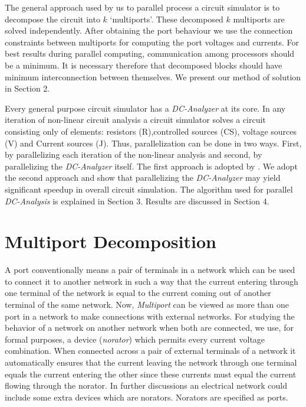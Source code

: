 \documentclass[12pt,psfig,a4]{article}
\begin{document}
The general approach used by us to parallel process a circuit simulator 
is to decompose the circuit into $k$ `multiports'. These
decomposed $k$ multiports are solved independently. 
After obtaining the port behaviour 
we use the connection constraints between multiports
for computing the port voltages and currents.
For best 
results during parallel computing, communication among processors should be a minimum. It is necessary therefore that  decomposed
blocks should have minimum interconnection between themselves.
We present our method of solution in
Section 2. 

Every general purpose circuit simulator has a {\it DC-Analyzer} at its core. In any iteration of non-linear circuit analysis a circuit simulator solves a 
circuit consisting only of elements: resistors (R),controlled sources (CS), voltage sources (V) and Current sources (J). Thus, parallelization can be done in two 
ways. First, by parallelizing each iteration of the non-linear analysis and second, by parallelizing the {\it DC-Analyzer} itself. The first 
approach is adopted by \cite{SIE}. We adopt the second approach \cite{GAK,NJB,GT} and show that parallelizing the {\it DC-Analyzer} may yield 
significant speedup in overall circuit simulation. The algorithm used for parallel {\it DC-Analysis} is explained in Section 3. 
Results are discussed in Section 4. 

\section{Multiport Decomposition}

A port conventionally means a pair of terminals in a network which can be used to connect it to another network in such a way 
that the current entering through one terminal of the network is equal to the current coming out of 
another terminal of the same network. Now, {\it Multiport} can be viewed as more than one port in a network 
to make connections with external networks. For studying the behavior of a network on another network when both are
connected, we use, for formal purposes, a device ({\it norator}) which permits every current voltage combination. When connected across
a pair of external terminals of a network it automatically 
ensures that the current leaving the network through one terminal equals the current entering the other since these currents must equal
the current flowing through the norator. In further discussions an electrical 
network could include some extra devices which are  norators. Norators are specified as ports. \par
\end{document}
